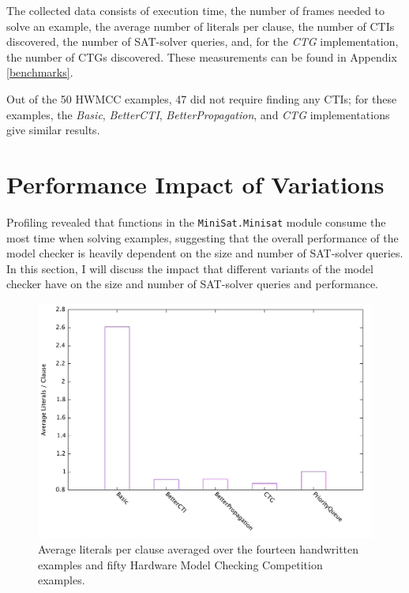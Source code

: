 \documentclass[12pt,a4paper,twoside,openright]{report}
\begin{document}
{The collected data consists of execution time,
the number of frames needed to solve an example,
the average number of literals per clause, the number of CTIs discovered, the number of SAT-solver queries,
and, for the \emph{CTG} implementation, the number of CTGs discovered. These measurements can be found in
Appendix \ref{benchmarks}.

Out of the 50 HWMCC examples, 47 did not require finding any
CTIs; for these examples, the \emph{Basic}, \emph{BetterCTI}, \emph{BetterPropagation},
and \emph{CTG} implementations give similar results. 

\section{Performance Impact of Variations}
\label{eval:variants}

Profiling revealed that functions in the \verb,MiniSat.Minisat, module consume the most time
when solving examples, suggesting that the overall performance of the model checker is heavily dependent on
the size and number of SAT-solver queries.
In this section, I will discuss the impact that different
variants of the model checker have on the size and number of SAT-solver queries and performance.

\begin{figure}[t]
\includegraphics[width=16cm]{litspercls.pdf}
\caption{Average literals per clause averaged over the fourteen handwritten examples and fifty Hardware
Model Checking Competition examples.}
\label{eval:lits}
\end{figure}

}
\end{document}
